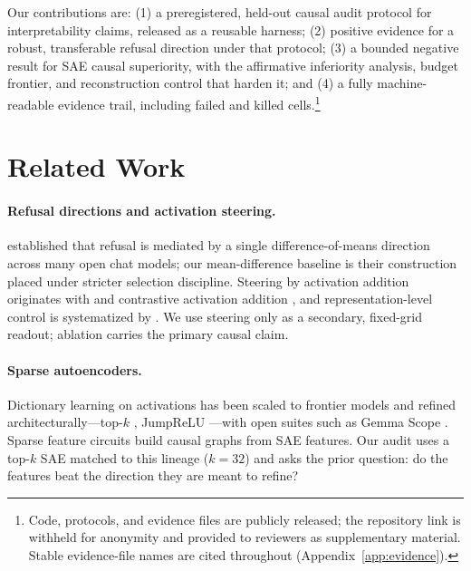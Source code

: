 \documentclass[11pt]{article}
\begin{document}
Our contributions are: (1) a preregistered, held-out causal audit protocol for
interpretability claims, released as a reusable harness; (2) positive evidence
for a robust, transferable refusal direction under that protocol; (3) a
bounded negative result for SAE causal superiority, with the affirmative
inferiority analysis, budget frontier, and reconstruction control that harden
it; and (4) a fully machine-readable evidence trail, including failed and
killed cells.\footnote{Code, protocols, and evidence files are publicly
released; the repository link is withheld for anonymity and provided to
reviewers as supplementary material.  Stable evidence-file names are cited
throughout (Appendix~\ref{app:evidence}).}

\section{Related Work}
\label{sec:related}

\paragraph{Refusal directions and activation steering.}
\citet{arditi2024refusal} established that refusal is mediated by a single
difference-of-means direction across many open chat models; our
mean-difference baseline is their construction placed under stricter selection
discipline.  Steering by activation addition originates with
\citet{turner2023activation} and contrastive activation addition
\citep{rimsky2024steering}, and representation-level control is systematized
by \citet{zou2023representation}.  We use steering only as a secondary,
fixed-grid readout; ablation carries the primary causal claim.

\paragraph{Sparse autoencoders.}
Dictionary learning on activations
\citep{bricken2023towards,cunningham2024sparse} has been scaled to frontier
models \citep{templeton2024scaling} and refined architecturally---top-$k$
\citep{gao2024scaling}, JumpReLU \citep{rajamanoharan2024jumping}---with open
suites such as Gemma Scope \citep{lieberum2024gemmascope}.  Sparse feature
circuits \citep{marks2025sparse} build causal graphs from SAE features.  Our
audit uses a top-$k$ SAE matched to this lineage ($k=32$) and asks the prior
question: do the features beat the direction they are meant to refine?
\end{document}
